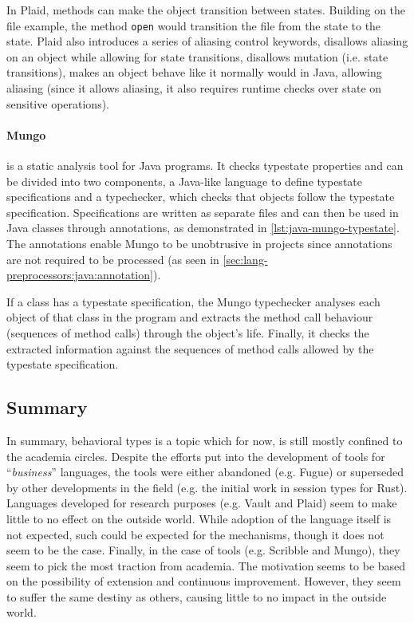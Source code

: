 In Plaid, methods can make the object transition between states. Building on the file example,
the method \texttt{open} would transition the file from the  state to the  state.
Plaid also introduces a series of aliasing control keywords,
 disallows aliasing on an object while allowing for state transitions,
 disallows mutation (i.e. state transitions),
 makes an object behave like it normally would in Java,
allowing aliasing (since it allows aliasing, it also requires runtime checks over state on sensitive operations).

\paragraph{Mungo} is a static analysis tool \autocite{Dardha2017, Kouzapas2018, Voinea2020} for Java programs.
It checks typestate properties and can be divided into two components, a Java-like language to define typestate specifications
and a typechecker, which checks that objects follow the typestate specification.
Specifications are written as separate files and can then be used in Java classes through annotations, as demonstrated in \autoref{lst:java-mungo-typestate}.
The annotations enable Mungo to be unobtrusive in projects since annotations are not required to be processed (as seen in \autoref{sec:lang-preprocessors:java:annotation}).
\begin{displayquote}
	If a class has a typestate specification, the Mungo typechecker analyses each object of that class in the program and extracts the method call behaviour (sequences of method calls) through
	the object’s life. Finally, it checks the extracted information against the sequences of method calls allowed by the typestate specification.
\end{displayquote}



\subsection{Summary}

In summary, behavioral types is a topic which for now, is still mostly confined to the academia circles.
Despite the efforts put into the development of tools for “\emph{business}” languages,
the tools were either abandoned (e.g. Fugue) or
superseded by other developments in the field (e.g. the initial work in session types for Rust).
Languages developed for research purposes (e.g. Vault and Plaid) seem to make little to no effect on the outside world.
While adoption of the language itself is not expected, such could be expected for the mechanisms,
though it does not seem to be the case.
Finally, in the case of tools (e.g. Scribble and Mungo), they seem to pick the most traction from academia.
The motivation seems to be based on the possibility of extension and continuous improvement.
However, they seem to suffer the same destiny as others, causing little to no impact in the outside world.